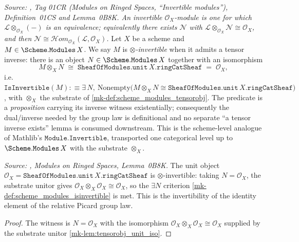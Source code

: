 \begin{definition}\label{mk-def:scheme_modules_isinvertible}

  \textit{Source: \cite{stacks-project}, Tag 01CR (Modules on Ringed Spaces,
  ``Invertible modules''), Definition~01CS and Lemma~0B8K. An invertible
  \(\mathcal{O}_X\)-module is one for which \(\mathcal{L} \otimes_{\mathcal{O}_X}
  (-)\) is an equivalence; equivalently there exists \(\mathcal{N}\) with
  \(\mathcal{L} \otimes_{\mathcal{O}_X} \mathcal{N} \cong \mathcal{O}_X\), and
  then \(\mathcal{N} \cong \mathcal{H}om_{\mathcal{O}_X}(\mathcal{L},
  \mathcal{O}_X)\).}
  Let \(X\) be a scheme and \(M \in \Scheme.\mathtt{Modules}\,X\). We say \(M\)
  is \emph{\(\otimes\)-invertible} when it admits a tensor inverse: there is an
  object \(N \in \Scheme.\mathtt{Modules}\,X\) together with an isomorphism
  \[
    M \otimes_X N \;\cong\;
      \mathtt{SheafOfModules.unit}\,X.\mathtt{ringCatSheaf}
      \;=\; \mathcal{O}_X ,
  \]
  i.e.\ \(\mathtt{IsInvertible}(M) :\equiv \exists\, N,\
  \mathrm{Nonempty}\bigl(M \otimes_X N \cong
  \mathtt{SheafOfModules.unit}\,X.\mathtt{ringCatSheaf}\bigr)\), with
  \(\otimes_X\) the substrate of \ref{mk-def:scheme_modules_tensorobj}. The
  predicate is a \emph{proposition} carrying its inverse witness existentially;
  consequently the dual/inverse needed by the group law is definitional and no
  separate ``a tensor inverse exists'' lemma is consumed downstream. This is the
  scheme-level analogue of Mathlib's \(\mathtt{Module.Invertible}\), transported
  one categorical level up to \(\Scheme.\mathtt{Modules}\,X\) with the substrate
  \(\otimes_X\).
\end{definition}

\begin{lemma}[The unit object is \(\otimes\)-invertible]\label{mk-lem:unit_isinvertible}
  \dcref{custom}

  \textit{Source: \cite{stacks-project}, Modules on Ringed Spaces, Lemma~0B8K.}
  The unit object \(\mathcal{O}_X = \mathtt{SheafOfModules.unit}\,X.\mathtt{ringCatSheaf}\)
  is \(\otimes\)-invertible: taking \(N = \mathcal{O}_X\), the substrate unitor gives
  \(\mathcal{O}_X \otimes_X \mathcal{O}_X \cong \mathcal{O}_X\), so the \(\exists N\)
  criterion \ref{mk-def:scheme_modules_isinvertible} is met. This is the invertibility of
  the identity element of the relative Picard group law.
\end{lemma}
\begin{proof}
 The witness is \(N = \mathcal{O}_X\) with the isomorphism
  \(\mathcal{O}_X \otimes_X \mathcal{O}_X \cong \mathcal{O}_X\) supplied by the substrate
  unitor \ref{mk-lem:tensorobj_unit_iso}.
\end{proof}

